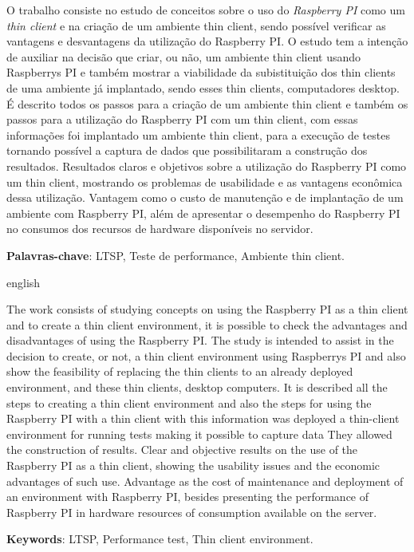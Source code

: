\documentclass[
	12pt,				%
	openright,			%
	twoside,			%
	a4paper,			%
	chapter=TITLE,		%
	english,			%
	brazil				%
	]{abntex2}
\begin{document}
\setlength{\absparsep}{18pt} %
\begin{resumo}
O trabalho consiste no estudo de conceitos sobre o uso do \textit{Raspberry PI} como um \textit{thin client} e na criação de um ambiente thin client, sendo possível verificar as vantagens e desvantagens da utilização do Raspberry PI. O estudo tem a intenção de auxiliar na decisão que criar, ou não, um ambiente thin client usando Raspberrys PI e também mostrar a viabilidade da subistituição dos thin clients de uma ambiente já implantado, sendo esses thin clients, computadores desktop. É descrito todos os passos para a criação de um ambiente thin client e também os passos para a utilização do Raspberry PI com um thin client, com essas informações foi implantado um ambiente thin client, para a execução de testes tornando possível a captura de dados que possibilitaram a construção dos resultados. Resultados claros e objetivos sobre a utilização do Raspberry PI como um thin client, mostrando os problemas de usabilidade e as vantagens econômica dessa utilização. Vantagem como o custo de manutenção e de implantação de um ambiente com Raspberry PI, além de apresentar o desempenho do Raspberry PI no consumos dos recursos de hardware disponíveis no servidor.


 \textbf{Palavras-chave}: LTSP, Teste de performance, Ambiente thin client.	%
\end{resumo}

\begin{resumo}[Abstract]
 \begin{otherlanguage*}{english}
   
   The work consists of studying concepts on using the Raspberry PI as a thin client and to create a thin client environment, it is possible to check the advantages and disadvantages of using the Raspberry PI. The study is intended to assist in the decision to create, or not, a thin client environment using Raspberrys PI and also show the feasibility of replacing the thin clients to an already deployed environment, and these thin clients, desktop computers. It is described all the steps to creating a thin client environment and also the steps for using the Raspberry PI with a thin client with this information was deployed a thin-client environment for running tests making it possible to capture data They allowed the construction of results. Clear and objective results on the use of the Raspberry PI as a thin client, showing the usability issues and the economic advantages of such use. Advantage as the cost of maintenance and deployment of an environment with Raspberry PI, besides presenting the performance of Raspberry PI in hardware resources of consumption available on the server.

   \vspace{\onelineskip}
 
   \noindent 
   \textbf{Keywords}: LTSP, Performance test, Thin client environment.
 \end{otherlanguage*}
\end{resumo}
\end{document}
